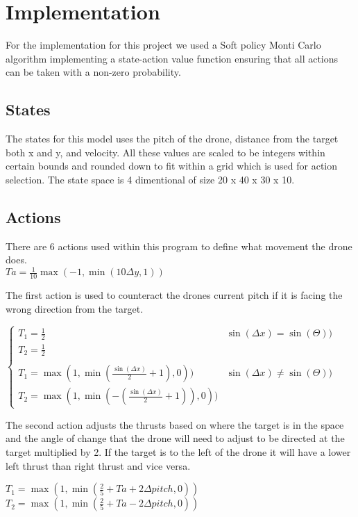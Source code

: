 \section{Implementation}
For the implementation for this project we used a Soft policy Monti Carlo algorithm implementing a state-action value function ensuring that all actions can be taken with a non-zero probability. 

\subsection{States}
The states for this model uses the pitch of the drone, distance from the target both x and y, and velocity. All these values are scaled to be integers within certain bounds and rounded down to fit within a grid which is used for action selection.  
The state space is 4 dimentional of size 20 x 40 x 30 x 10. 
\subsection{Actions}
There are 6 actions used within this program to define what movement the drone does.
\\
\begingroup\centering
$Ta =  \frac{1}{10}\max (-1,\min (10\Delta y,1))$

\endgroup


The first action is used to counteract the drones current pitch if it is facing the wrong direction from the target. 

\begingroup\centering
$\left\{\begin{matrix}
    T_1 = \frac{1}{2} & \sin(\Delta x) = \sin(\Theta ))
    & \\
    T_2 = \frac{1}{2}
    \\ \\
    T_1 = \max (1,\min (\frac{\sin (\Delta x)}{2}+1),0)) & \sin(\Delta x) \neq \sin(\Theta ))
    & \\
    T_2 = \max (1,\min (-(\frac{\sin (\Delta x)}{2}+1)),0))
    \end{matrix}\right.$

\endgroup

The second action adjusts the thrusts based on where the target is in the space and the angle of change that the drone will need to adjust to be directed at the target multiplied by 2. If the target is to the left of the drone it will have a lower left thrust than right thrust and vice versa. 

\begingroup\centering
$T_1 = \max (1,\min (\frac{2}{5}+Ta+2\Delta pitch,0))$
$T_2 = \max (1,\min (\frac{2}{5}+Ta-2\Delta pitch,0))$

